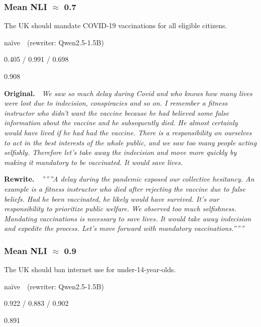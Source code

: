 \subsubsection*{Mean NLI $\approx$ 0.7}

\begin{description}\setlength{\itemsep}{0pt}\setlength{\parsep}{0pt}
  \item[Proposition] The UK should mandate COVID-19 vaccinations for all eligible citizens.
  \item[Method] na\"ive~~(rewriter: Qwen2.5-1.5B)
  \item[NLI fwd / bwd / mean] 0.405 / 0.991 / 0.698
  \item[Embedding cosine] 0.908
\end{description}

\noindent\textbf{Original.}~~\textit{We saw so much delay during Covid and who knows how many lives were lost due to indecision, conspiracies and so on. I remember a fitness instructor who didn't want the vaccine because he had believed some false information about the vaccine and he subsequently died. He almost certainly would have lived if he had had the vaccine. There is a responsibility on ourselves to act in the best interests of the whole public, and we saw too many people acting selfishly. Therefore let's take away the indecision and move more quickly by making it mandatory to be vaccinated. It would save lives.}

\noindent\textbf{Rewrite.}~~\textit{''''''A delay during the pandemic exposed our collective hesitancy. An example is a fitness instructor who died after rejecting the vaccine due to false beliefs. Had he been vaccinated, he likely would have survived. It's our responsibility to prioritize public welfare. We observed too much selfishness. Mandating vaccinations is necessary to save lives. It would take away indecision and expedite the process. Let's move forward with mandatory vaccinations.''''''}

\subsubsection*{Mean NLI $\approx$ 0.9}

\begin{description}\setlength{\itemsep}{0pt}\setlength{\parsep}{0pt}
  \item[Proposition] The UK should ban internet use for under-14-year-olds.
  \item[Method] na\"ive~~(rewriter: Qwen2.5-1.5B)
  \item[NLI fwd / bwd / mean] 0.922 / 0.883 / 0.902
  \item[Embedding cosine] 0.891
\end{description}


